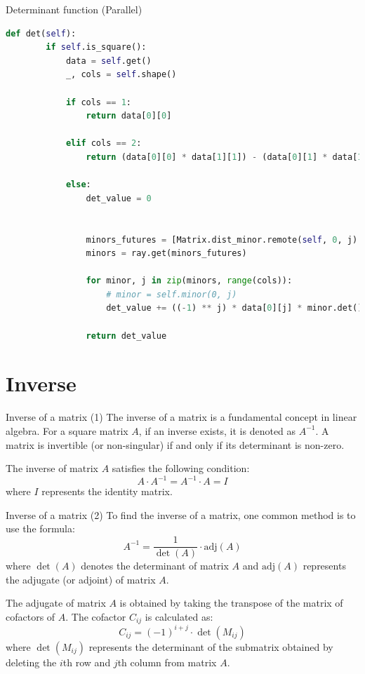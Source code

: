 \documentclass{beamer}
\begin{document}
\begin{frame}[fragile]{Determinant function (Parallel)}

    \begin{lstlisting}[language=Python]
    def det(self):
        if self.is_square():
            data = self.get()
            _, cols = self.shape()
    
            if cols == 1:
                return data[0][0]
    
            elif cols == 2:
                return (data[0][0] * data[1][1]) - (data[0][1] * data[1][0])
    
            else:
                det_value = 0
    
    
                minors_futures = [Matrix.dist_minor.remote(self, 0, j) for j in range(cols)]
                minors = ray.get(minors_futures)
    
                for minor, j in zip(minors, range(cols)):
                    # minor = self.minor(0, j)
                    det_value += ((-1) ** j) * data[0][j] * minor.det()
    
                return det_value
    \end{lstlisting}
\end{frame}




\section{Inverse}
\begin{frame}{Inverse of a matrix (1)}
    The \alert{inverse of a matrix} is a fundamental concept in linear algebra. For a square matrix $A$, if an inverse exists, it is denoted as $A^{-1}$. A matrix is invertible (or non-singular) if and only if its determinant is non-zero.

    The inverse of matrix $A$ satisfies the following condition:
    $$
        A \cdot A^{-1} = A^{-1} \cdot A = I
    $$
    where $I$ represents the identity matrix.

\end{frame}

\begin{frame}{Inverse of a matrix (2)}
    To find the inverse of a matrix, one common method is to use the formula:
    $$
        A^{-1} = \frac{1}{\det(A)} \cdot \text{adj}(A)
    $$
    where $\det(A)$ denotes the determinant of matrix $A$ and $\text{adj}(A)$ represents the adjugate (or adjoint) of matrix $A$.

    The adjugate of matrix $A$ is obtained by taking the transpose of the matrix of cofactors of $A$. The cofactor $C_{ij}$ is calculated as:
    $$
        C_{ij} = (-1)^{i+j} \cdot \det(M_{ij})
    $$
    where $\det(M_{ij})$ represents the determinant of the submatrix obtained by deleting the $i$th row and $j$th column from matrix $A$.
\end{frame}
\end{document}
